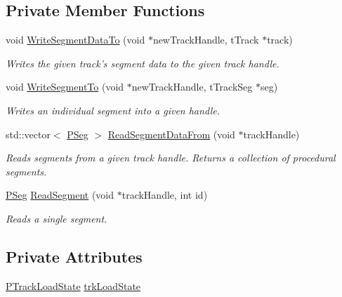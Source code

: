 \subsection*{Private Member Functions}
\begin{DoxyCompactItemize}
\item 
void \hyperlink{classprocedural_1_1_p_track_file_manager_a2eec20eb32af5b4e865f4a57a8df908e}{Write\-Segment\-Data\-To} (void $\ast$new\-Track\-Handle, t\-Track $\ast$track)
\begin{DoxyCompactList}\small\item\em Writes the given track's segment data to the given track handle. \end{DoxyCompactList}\item 
void \hyperlink{classprocedural_1_1_p_track_file_manager_a8947ff1a42bdd9bf611948b327167d3e}{Write\-Segment\-To} (void $\ast$new\-Track\-Handle, t\-Track\-Seg $\ast$seg)
\begin{DoxyCompactList}\small\item\em Writes an individual segment into a given handle. \end{DoxyCompactList}\item 
std\-::vector$<$ \hyperlink{classprocedural_1_1_p_seg}{P\-Seg} $>$ \hyperlink{classprocedural_1_1_p_track_file_manager_aaf01f0cf5ccc0933774d93da59597af7}{Read\-Segment\-Data\-From} (void $\ast$track\-Handle)
\begin{DoxyCompactList}\small\item\em Reads segments from a given track handle. Returns a collection of procedural segments. \end{DoxyCompactList}\item 
\hyperlink{classprocedural_1_1_p_seg}{P\-Seg} \hyperlink{classprocedural_1_1_p_track_file_manager_ab9972ce81237a96ce015179a9fd7a0ba}{Read\-Segment} (void $\ast$track\-Handle, int id)
\begin{DoxyCompactList}\small\item\em Reads a single segment. \end{DoxyCompactList}\end{DoxyCompactItemize}
\subsection*{Private Attributes}
\begin{DoxyCompactItemize}
\item 
\hyperlink{classprocedural_1_1_p_track_load_state}{P\-Track\-Load\-State} \hyperlink{classprocedural_1_1_p_track_file_manager_a9ced08aad81bc7f886e653d4ace038b9}{trk\-Load\-State}
\end{DoxyCompactItemize}


